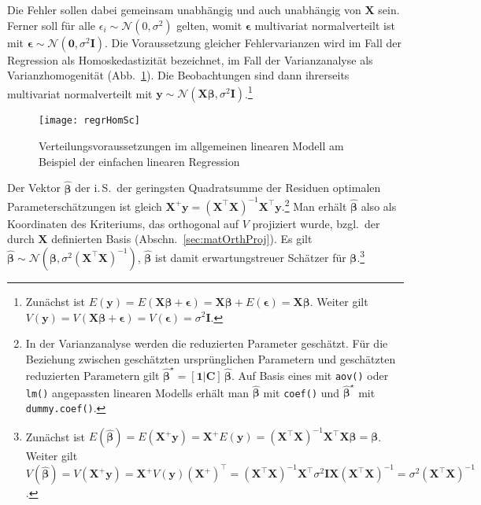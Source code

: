 Die Fehler sollen dabei gemeinsam unabhängig und auch unabhängig von $\bm{X}$ sein. Ferner soll für alle $\epsilon_{i} \sim \mathcal{N}(0, \sigma^{2})$ gelten, womit $\bm{\epsilon}$ multivariat normalverteilt ist mit $\bm{\epsilon} \sim \bm{\mathcal{N}}(\bm{0}, \sigma^{2} \bm{I})$. Die Voraussetzung gleicher Fehlervarianzen wird im Fall der Regression als Homoskedastizität bezeichnet, im Fall der Varianzanalyse als Varianzhomogenität (Abb.\ \ref{fig:regrHomSc}). Die Beobachtungen sind dann ihrerseits multivariat normalverteilt mit $\bm{y} \sim \bm{\mathcal{N}}(\bm{X} \bm{\beta}, \sigma^{2} \bm{I})$.\footnote{Zunächst ist $E(\bm{y}) = E(\bm{X} \bm{\beta} + \bm{\epsilon}) = \bm{X} \bm{\beta} + E(\bm{\epsilon}) = \bm{X} \bm{\beta}$. Weiter gilt $V(\bm{y}) = V(\bm{X} \bm{\beta} + \bm{\epsilon}) = V(\bm{\epsilon}) = \sigma^{2} \bm{I}$.}

\begin{figure}[ht]
\centering
\texttt{[image: regrHomSc]}
\vspace*{-1em}
\caption{Verteilungsvoraussetzungen im allgemeinen linearen Modell am Beispiel der einfachen linearen Regression}
\label{fig:regrHomSc}
\end{figure}

Der Vektor $\hat{\bm{\beta}}$ der i.\,S.\ der geringsten Quadratsumme der Residuen optimalen Parameterschätzungen ist gleich $\bm{X}^{+} \bm{y} = (\bm{X}^{\top} \bm{X})^{-1} \bm{X}^{\top} \bm{y}$.\footnote{\label{ftn:dummyCoef}In der Varianzanalyse werden die reduzierten Parameter geschätzt. Für die Beziehung zwischen geschätzten ursprünglichen Parametern und geschätzten reduzierten Parametern gilt $\hat{\bm{\beta}}^{\star} = [\bm{1} | \bm{C}] \, \hat{\bm{\beta}}$. Auf Basis eines mit \lstinline!aov()! oder \lstinline!lm()! angepassten linearen Modells erhält man $\hat{\bm{\beta}}$ mit \lstinline!coef()! und $\hat{\bm{\beta}}^{\star}$ mit \lstinline!dummy.coef()!.} Man erhält $\hat{\bm{\beta}}$ also als Koordinaten des Kriteriums, das orthogonal auf $V$ projiziert wurde, bzgl.\ der durch $\bm{X}$ definierten Basis (Abschn.\ \ref{sec:matOrthProj}). Es gilt $\hat{\bm{\beta}} \sim \bm{\mathcal{N}}(\bm{\beta}, \sigma^{2} (\bm{X}^{\top} \bm{X})^{-1})$, $\hat{\bm{\beta}}$ ist damit erwartungstreuer Schätzer für $\bm{\beta}$.\footnote{Zunächst ist $E(\hat{\bm{\beta}}) = E(\bm{X}^{+} \bm{y}) = \bm{X}^{+} E(\bm{y}) = (\bm{X}^{\top} \bm{X})^{-1} \bm{X}^{\top} \bm{X} \bm{\beta} = \bm{\beta}$. Weiter gilt $V(\hat{\bm{\beta}}) = V(\bm{X}^{+} \bm{y}) = \bm{X}^{+} V(\bm{y}) (\bm{X}^{+})^{\top} = (\bm{X}^{\top} \bm{X})^{-1} \bm{X}^{\top} \sigma^{2} \bm{I} \bm{X} (\bm{X}^{\top} \bm{X})^{-1} = \sigma^{2} (\bm{X}^{\top} \bm{X})^{-1}$.}


